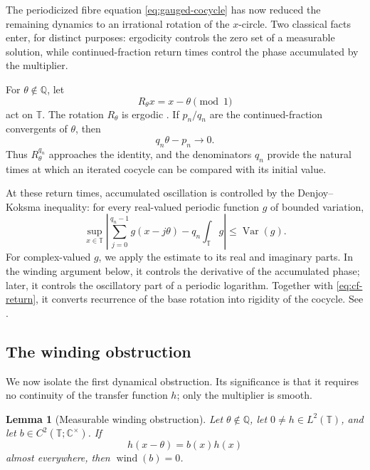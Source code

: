 \documentclass[reqno]{amsart}
\newtheorem{lemma}[theorem]{Lemma}
\theoremstyle{remark}
\numberwithin{equation}{section}
\newcommand{\Q}{\mathbb{Q}}
\newcommand{\T}{\mathbb{T}}
\newcommand{\C}{\mathbb{C}}
\newcommand{\Var}{\operatorname{Var}}
\newcommand{\wind}{\operatorname{wind}}
\begin{document}
The periodicized fibre equation \eqref{eq:gauged-cocycle} has now reduced the
remaining dynamics to an irrational rotation of the \(x\)-circle. Two
classical facts enter, for distinct purposes: ergodicity controls the zero set
of a measurable solution, while continued-fraction return times control the
phase accumulated by the multiplier.

For \(\theta\notin\Q\), let
\[
  R_\theta x=x-\theta\pmod 1
\]
act on \(\T\). The rotation \(R_\theta\) is ergodic \cite{Petersen}. If
\(p_n/q_n\) are the continued-fraction convergents of \(\theta\), then
\begin{equation}
  q_n\theta-p_n\longrightarrow0.
  \label{eq:cf-return}
\end{equation}
Thus \(R_\theta^{q_n}\) approaches the identity, and the denominators
\(q_n\) provide the natural times at which an iterated cocycle can be
compared with its initial value.

At these return times, accumulated oscillation is controlled by the
Denjoy--Koksma inequality: for every real-valued periodic function \(g\) of
bounded variation,
\begin{equation}
  \sup_{x\in\T}
  \left|
    \sum_{j=0}^{q_n-1}g(x-j\theta)
    -q_n\int_\T g
  \right|
  \leq \Var(g).
  \label{eq:denjoy-koksma}
\end{equation}
For complex-valued \(g\), we apply the estimate to its real and imaginary
parts. In the winding argument below, it controls the derivative of the
accumulated phase; later, it controls the oscillatory part of a periodic
logarithm. Together with \eqref{eq:cf-return}, it converts recurrence of the
base rotation into rigidity of the cocycle. See
\cite{Khinchin,KuipersNiederreiter,KatokHasselblatt}.

\subsection{The winding obstruction}

We now isolate the first dynamical obstruction. Its significance is that it
requires no continuity of the transfer function \(h\); only the multiplier is
smooth.

\begin{lemma}[Measurable winding obstruction]
\label{lem:winding}
Let \(\theta\notin\Q\), let \(0\neq h\in L^2(\T)\), and let
\(b\in C^2(\T;\C^\times)\). If
\begin{equation}
  h(x-\theta)=b(x)h(x)
  \label{eq:abstract-cocycle}
\end{equation}
almost everywhere, then \(\wind(b)=0\).
\end{lemma}
\end{document}
